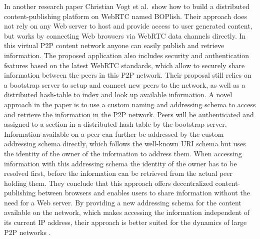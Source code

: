 In another research paper Christian Vogt et al.\ show how to build a distributed content-publishing platform on \gls{WebRTC} named BOPlish. Their approach does not rely on any Web server to host and provide access to user generated content, but works by connecting Web browsers via \gls{WebRTC} data channels directly. In this virtual \gls{P2P} content network anyone can easily publish and retrieve information. The proposed application also includes security and authentication features based on the latest \gls{WebRTC} standards, which allow to securely share information between the peers in this \gls{P2P} network. Their proposal still relies on a bootstrap server to setup and connect new peers to the network, as well as a distributed hash-table to index and look up available information. A novel approach in the paper is to use a custom naming and addressing schema to access and retrieve the information in the \gls{P2P} network. Peers will be authenticated and assigned to a section in a distributed hash-table by the bootstrap server. Information available on a peer can further be addressed by the custom addressing schema directly, which follows the well-known \gls{URI} schema but uses the identity of the owner of the information to address them. When accessing information with this addressing schema the identity of the owner has to be resolved first, before the information can be retrieved from the actual peer holding them. They conclude that this approach offers decentralized content-publishing between browsers and enables users to share information without the need for a Web server. By providing a new addressing schema for the content available on the network, which makes accessing the information independent of its current \gls{IP} address, their approach is better suited for the dynamics of large \gls{P2P} networks \citep{vogt2013content}. \\

